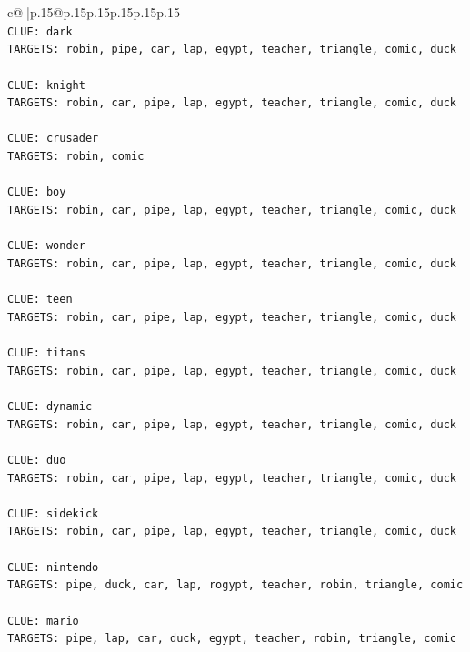 \documentclass{article}
\begin{document}
{\begin{supertabular}{c@{$\;$}|p{.15\linewidth}@{}p{.15\linewidth}p{.15\linewidth}p{.15\linewidth}p{.15\linewidth}p{.15\linewidth}}
{{{\\ 
\texttt{CLUE: dark} \\
\texttt{TARGETS: robin, pipe, car, lap, egypt, teacher, triangle, comic, duck} \\
\\ 
\texttt{CLUE: knight} \\
\texttt{TARGETS: robin, car, pipe, lap, egypt, teacher, triangle, comic, duck} \\
\\ 
\texttt{CLUE: crusader} \\
\texttt{TARGETS: robin, comic} \\
\\ 
\texttt{CLUE: boy} \\
\texttt{TARGETS: robin, car, pipe, lap, egypt, teacher, triangle, comic, duck} \\
\\ 
\texttt{CLUE: wonder} \\
\texttt{TARGETS: robin, car, pipe, lap, egypt, teacher, triangle, comic, duck} \\
\\ 
\texttt{CLUE: teen} \\
\texttt{TARGETS: robin, car, pipe, lap, egypt, teacher, triangle, comic, duck} \\
\\ 
\texttt{CLUE: titans} \\
\texttt{TARGETS: robin, car, pipe, lap, egypt, teacher, triangle, comic, duck} \\
\\ 
\texttt{CLUE: dynamic} \\
\texttt{TARGETS: robin, car, pipe, lap, egypt, teacher, triangle, comic, duck} \\
\\ 
\texttt{CLUE: duo} \\
\texttt{TARGETS: robin, car, pipe, lap, egypt, teacher, triangle, comic, duck} \\
\\ 
\texttt{CLUE: sidekick} \\
\texttt{TARGETS: robin, car, pipe, lap, egypt, teacher, triangle, comic, duck} \\
\\ 
\texttt{CLUE: nintendo} \\
\texttt{TARGETS: pipe, duck, car, lap, rogypt, teacher, robin, triangle, comic} \\
\\ 
\texttt{CLUE: mario} \\
\texttt{TARGETS: pipe, lap, car, duck, egypt, teacher, robin, triangle, comic} \\
}}}
\end{supertabular}}
\end{document}
